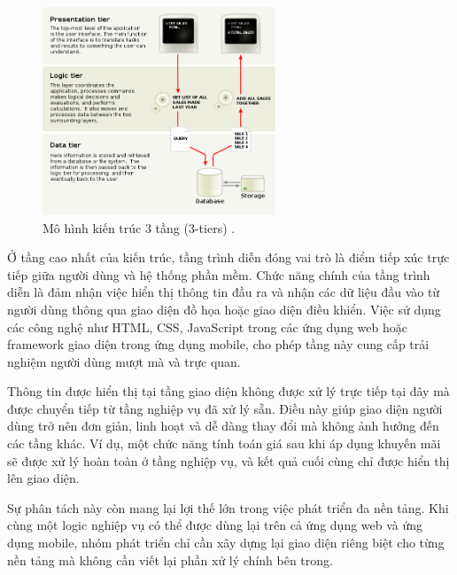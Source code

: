 \begin{figure}[H]
  \centering
  \includegraphics[width=0.62\textwidth]{images/layer.png}
  \caption{Mô hình kiến trúc 3 tầng (3-tiers) \cite{vneconomyNokia}.}
  \label{fig:15}
\end{figure}
  
  
  Ở tầng cao nhất của kiến trúc, tầng trình diễn đóng vai trò là điểm tiếp xúc trực tiếp giữa người dùng và hệ thống phần mềm. Chức năng chính của tầng trình diễn là đảm nhận việc hiển thị thông tin đầu ra và nhận các dữ liệu đầu vào từ người dùng thông qua giao diện đồ họa hoặc giao diện điều khiển. Việc sử dụng các công nghệ như HTML, CSS, JavaScript trong các ứng dụng web hoặc framework giao diện trong ứng dụng mobile, cho phép tầng này cung cấp trải nghiệm người dùng mượt mà và trực quan.
  \vspace{0.5em}
  
  
  Thông tin được hiển thị tại tầng giao diện không được xử lý trực tiếp tại đây mà được chuyển tiếp từ tầng nghiệp vụ đã xử lý sẵn. Điều này giúp giao diện người dùng trở nên đơn giản, linh hoạt và dễ dàng thay đổi mà không ảnh hưởng đến các tầng khác. Ví dụ, một chức năng tính toán giá sau khi áp dụng khuyến mãi sẽ được xử lý hoàn toàn ở tầng nghiệp vụ, và kết quả cuối cùng chỉ được hiển thị lên giao diện.
  \vspace{0.5em}
  
  
  Sự phân tách này còn mang lại lợi thế lớn trong việc phát triển đa nền tảng. Khi cùng một logic nghiệp vụ có thể được dùng lại trên cả ứng dụng web và ứng dụng mobile, nhóm phát triển chỉ cần xây dựng lại giao diện riêng biệt cho từng nền tảng mà không cần viết lại phần xử lý chính bên trong.
  \vspace{0.5em}
  

